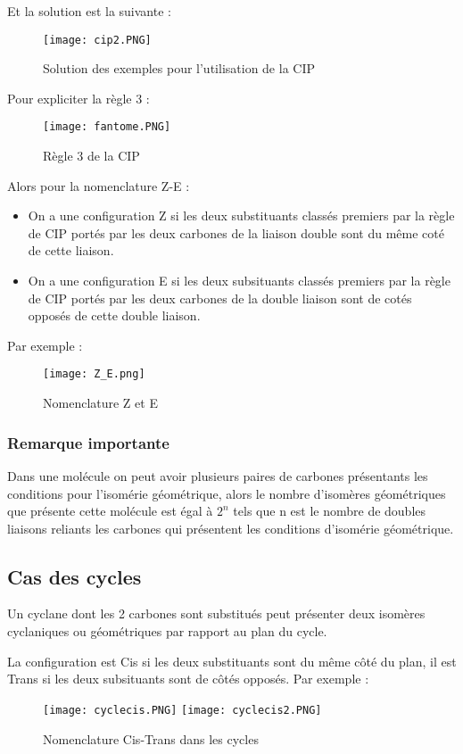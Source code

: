 \documentclass[a4paper, oneside]{book}
\begin{document}
Et la solution est la suivante :
\begin{figure}[!h]
    \centering
    \texttt{[image: cip2.PNG]}
    \caption{Solution des exemples pour l'utilisation de la CIP}
    \label{fig:my_label}
\end{figure}

Pour expliciter la règle 3 :
\begin{figure}[!h]
    \centering
    \texttt{[image: fantome.PNG]}
    \caption{Règle 3 de la CIP}
    \label{fig:my_label}
\end{figure}

Alors pour la nomenclature Z-E :
\begin{itemize}
    \item On a une configuration Z si les deux substituants classés premiers par la règle de CIP portés par les deux carbones de la liaison double sont du même coté de cette liaison.
    \item On a une configuration E si les deux subsituants classés premiers par la règle de CIP portés par les deux carbones de la double liaison sont de cotés opposés de cette double liaison.
\end{itemize}
Par exemple :
\begin{figure}[!h]
    \centering
    \texttt{[image: Z\_E.png]}
    \caption{Nomenclature Z et E}
    \label{fig:my_label}
\end{figure}

\subsubsection{Remarque importante}
Dans une molécule on peut avoir plusieurs paires de carbones présentants les conditions pour l'isomérie géométrique, alors le nombre d'isomères géométriques que présente cette molécule est égal à $2^n$ tels que n est le nombre de doubles liaisons reliants les carbones qui présentent les conditions d'isomérie géométrique.
\subsection{Cas des cycles}
Un cyclane dont les 2 carbones sont substitués peut présenter deux isomères cyclaniques ou géométriques par rapport au plan du cycle.

La configuration est Cis si les deux substituants sont du même côté du plan, il est Trans si les deux subsituants sont de côtés opposés. Par exemple :
\begin{figure}[!h]
    \centering
    \texttt{[image: cyclecis.PNG]}
    \texttt{[image: cyclecis2.PNG]}
    \caption{Nomenclature Cis-Trans dans les cycles}
    \label{fig:my_label}
\end{figure}
\end{document}
